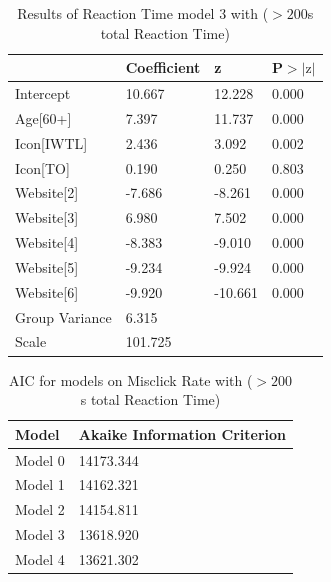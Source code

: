 \documentclass[12pt,twoside]{reedthesis}
\begin{document}
\begin{table}[h!]
        \centering
        \begin{tabular}{| p{5cm} | p{2.5cm} | p{2.5cm} | p{2.5cm} |}
            \hline
            & Coefficient & z & P$>|\text{z}|$\\
            \hline
            Intercept & 10.667 & 12.228 & 0.000\\
            \hline
            Age[60+] & 7.397 & 11.737 & 0.000\\
            \hline
            Icon[IWTL] & 2.436 & 3.092 & 0.002\\
            \hline
            Icon[TO] & 0.190 & 0.250 & 0.803\\
            \hline
            Website[2] & -7.686 & -8.261 & 0.000\\
            \hline
            Website[3] & 6.980 & 7.502 & 0.000\\
            \hline
            Website[4] & -8.383 & -9.010 & 0.000\\
            \hline
            Website[5] & -9.234 & -9.924 & 0.000\\
            \hline
            Website[6] & -9.920 & -10.661 & 0.000\\
            \hline
            Group Variance & 6.315 &&\\
            \hline
            Scale & 101.725 &&\\
            \hline
        \end{tabular}
        \caption{Results of Reaction Time model 3 with ($>200$s total Reaction Time)}
    \end{table}

\begin{table}[h!]
        \centering
        \begin{tabular}{| p{3.5cm} | p{7.5cm} |}
            \hline
            Model & Akaike Information Criterion\\
            \hline
            Model 0 & 14173.344\\
            \hline
            Model 1 & 14162.321\\
            \hline
            Model 2 & 14154.811\\
            \hline
            Model 3 & 13618.920\\
            \hline
            Model 4 & 13621.302\\
            \hline
        \end{tabular}
        \caption{AIC for models on Misclick Rate with ($>200$s total Reaction Time)}
    \end{table}
\end{document}
